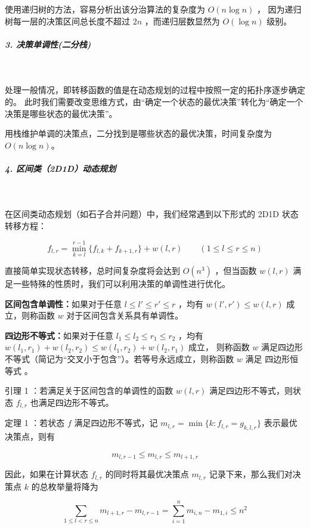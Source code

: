 使用递归树的方法，容易分析出该分治算法的复杂度为 $O(n\log n)$ ，
因为递归树每一层的决策区间总长度不超过 $2n$ ，而递归层数显然为 $O(\log n)$ 级别。 \par

\subparagraph{3. 决策单调性(二分栈)}~{}
\par

处理一般情况，即转移函数的值是在动态规划的过程中按照一定的拓扑序逐步确定的。
此时我们需要改变思维方式，由“确定一个状态的最优决策”转化为“确定一个决策是哪些状态的最优决策”。 \par

用栈维护单调的决策点，二分找到是哪些状态的最优决策，时间复杂度为 $O(n\log n)$。 \par

\subparagraph{4. 区间类（2D1D）动态规划}~{}
\par

在区间类动态规划（如石子合并问题）中，我们经常遇到以下形式的 2D1D 状态转移方程：

$$
f_{l,r} = \min_{k=l}^{r-1}\{f_{l,k}+f_{k+1,r}\} + w(l,r)\qquad\left(1 \leq l \leq r \leq n\right)
$$

直接简单实现状态转移，总时间复杂度将会达到 $O(n^3)$ ，但当函数 $w(l,r)$ 满足一些特殊的性质时，我们可以利用决策的单调性进行优化。\par

\textbf{区间包含单调性：}如果对于任意 $l \leq l' \leq r' \leq r$ ，均有 $w(l',r') \leq w(l,r)$ 成立，则称函数 $w$ 对于区间包含关系具有单调性。 \par
\textbf{四边形不等式：}如果对于任意 $l_1\leq l_2 \leq r_1 \leq r_2$ ，均有 $w(l_1,r_1)+w(l_2,r_2) \leq w(l_1,r_2) + w(l_2,r_1)$ 成立，
则称函数 $w$ 满足四边形不等式（简记为“交叉小于包含”）。若等号永远成立，则称函数 $w$ 满足 四边形恒等式 。\par

引理 1 ：若满足关于区间包含的单调性的函数 $w(l, r)$ 满足四边形不等式，则状态 $f_{l,r}$ 也满足四边形不等式。\par

定理 1 ：若状态 $f$ 满足四边形不等式，记 $m_{l,r}=\min\{k:f_{l,r} = g_{k,l,r}\}$ 表示最优决策点，则有

$$
m_{l,r-1} \leq m_{l,r} \leq m_{l+1,r}
$$

因此，如果在计算状态 $f_{l,r}$ 的同时将其最优决策点 $m_{l,r}$ 记录下来，那么我们对决策点 $k$ 的总枚举量将降为

$$
\sum_{1\leq l<r\leq n} m_{l+1,r} - m_{l,r-1} = \sum_{i=1}^n m_{i,n} - m_{1,i}\leq n^2
$$


